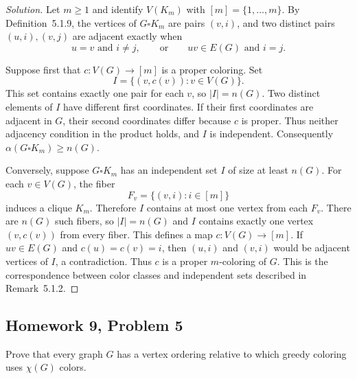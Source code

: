 \documentclass[12pt]{amsart}
\newenvironment{solution}{\begin{proof}[Solution]}{\end{proof}}
\begin{document}
    \begin{solution}
        Let $m\geq1$ and identify $V(K_m)$ with $[m]=\{1,\ldots,m\}$.
        By Definition~5.1.9, the vertices of $G\square K_m$ are pairs $(v,i)$,
        and two distinct pairs $(u,i),(v,j)$ are adjacent exactly when
        \[
            u=v\text{ and }i\ne j,
            \qquad\text{or}\qquad
            uv\in E(G)\text{ and }i=j.
        \]

        Suppose first that $c:V(G)\to[m]$ is a proper coloring.  Set
        \[
            I=\{(v,c(v)):v\in V(G)\}.
        \]
        This set contains exactly one pair for each $v$, so $|I|=n(G)$.
        Two distinct elements of $I$ have different first coordinates.
        If their first coordinates are adjacent in $G$, their second
        coordinates differ because $c$ is proper.  Thus neither adjacency
        condition in the product holds, and $I$ is independent.  Consequently
        $\alpha(G\square K_m)\geq n(G)$.

        Conversely, suppose $G\square K_m$ has an independent set $I$ of
        size at least $n(G)$.  For each $v\in V(G)$, the fiber
        \[
            F_v=\{(v,i):i\in[m]\}
        \]
        induces a clique $K_m$.  Therefore $I$ contains at most one vertex
        from each $F_v$.  There are $n(G)$ such fibers, so $|I|=n(G)$ and
        $I$ contains exactly one vertex $(v,c(v))$ from every fiber.
        This defines a map $c:V(G)\to[m]$.  If $uv\in E(G)$ and
        $c(u)=c(v)=i$, then $(u,i)$ and $(v,i)$ would be adjacent vertices
        of $I$, a contradiction.  Thus $c$ is a proper $m$-coloring of $G$.
        This is the correspondence between color classes and independent
        sets described in Remark~5.1.2.
    \end{solution}

    \subsection*{Homework 9, Problem 5} Prove that every graph $G$ has a vertex ordering relative to which
    greedy coloring uses $\chi(G)$ colors.
\end{document}
